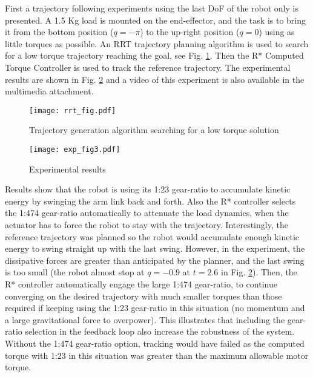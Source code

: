 First a trajectory following experiments using the last DoF of the robot only is presented. A 1.5 Kg load is mounted on the end-effector, and the task is to bring it from the bottom position ($q=-\pi$) to the up-right position ($q=0$) using as little torques as possible. An RRT trajectory planning algorithm is used to search for a low torque trajectory reaching the goal, see Fig. \ref{fig:exp_rrt}. Then the R* Computed Torque Controller is used to track the reference trajectory. The experimental results are shown in Fig. \ref{fig:exp_traj} and a video of this experiment is also available in the multimedia attachment. 
%
\begin{figure}[htp]
	\centering
		\texttt{[image: rrt\_fig.pdf]}
	\caption{Trajectory generation algorithm searching for a low torque solution}
	\label{fig:exp_rrt}
\end{figure}
%
\begin{figure}[htp]
	\centering
		\texttt{[image: exp\_fig3.pdf]}
	\caption{Experimental results}
	\label{fig:exp_traj}
	\vspace{-10pt}
\end{figure}
%
Results show that the robot is using its 1:23 gear-ratio to accumulate kinetic energy by swinging the arm link back and forth. Also the R* controller selects the 1:474 gear-ratio automatically to attenuate the load dynamics, when the actuator has to force the robot to stay with the trajectory.  Interestingly, the reference trajectory was planned so the robot would accumulate enough kinetic energy to swing straight up with the last swing. However, in the experiment, the dissipative forces are greater than anticipated by the planner, and the last swing is too small (the robot almost stop at $q=-0.9$ at $t=2.6$ in Fig. \ref{fig:exp_traj}). Then, the R* controller automatically engage the large 1:474 gear-ratio, to continue converging on the desired trajectory with much smaller torques than those required if keeping using the 1:23 gear-ratio in this situation (no momentum and a large gravitational force to overpower). This illustrates that including the gear-ratio selection in the feedback loop also increase the robustness of the system. Without the 1:474 gear-ratio option, tracking would have failed as the computed torque with 1:23 in this situation was greater than the maximum allowable motor torque.


